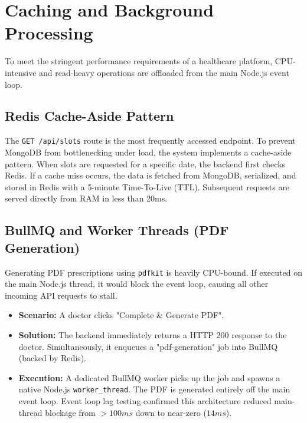 \documentclass[12pt, a4paper]{article}
\begin{document}
\section{Caching and Background Processing}
To meet the stringent performance requirements of a healthcare platform, CPU-intensive and read-heavy operations are offloaded from the main Node.js event loop.

\subsection{Redis Cache-Aside Pattern}
The \texttt{GET /api/slots} route is the most frequently accessed endpoint. To prevent MongoDB from bottlenecking under load, the system implements a cache-aside pattern. When slots are requested for a specific date, the backend first checks Redis. If a cache miss occurs, the data is fetched from MongoDB, serialized, and stored in Redis with a 5-minute Time-To-Live (TTL). Subsequent requests are served directly from RAM in less than 20ms.

\subsection{BullMQ and Worker Threads (PDF Generation)}
Generating PDF prescriptions using \texttt{pdfkit} is heavily CPU-bound. If executed on the main Node.js thread, it would block the event loop, causing all other incoming API requests to stall.
\begin{itemize}
    \item \textbf{Scenario:} A doctor clicks "Complete \& Generate PDF".
    \item \textbf{Solution:} The backend immediately returns a HTTP 200 response to the doctor. Simultaneously, it enqueues a "pdf-generation" job into BullMQ (backed by Redis).
    \item \textbf{Execution:} A dedicated BullMQ worker picks up the job and spawns a native Node.js \texttt{worker\_thread}. The PDF is generated entirely off the main event loop. Event loop lag testing confirmed this architecture reduced main-thread blockage from $>100ms$ down to near-zero ($14ms$).
\end{itemize}

\end{document}
